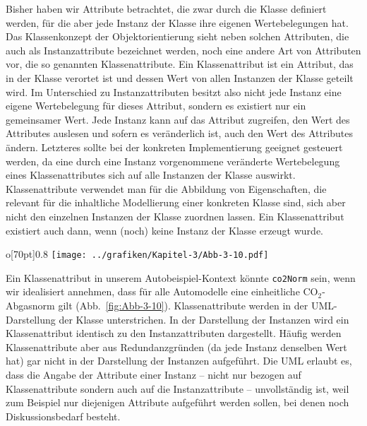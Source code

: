 Bisher haben wir Attribute betrachtet, die zwar durch die Klasse definiert werden, für die aber jede Instanz der Klasse ihre eigenen Wertebelegungen hat. Das Klassenkonzept der Objektorientierung sieht neben solchen Attributen, die auch als Instanzattribute bezeichnet werden, noch eine andere Art von Attributen vor, die so genannten Klassenattribute. 
Ein Klassenattribut ist ein Attribut, das in der Klasse verortet ist und dessen Wert von allen Instanzen der Klasse geteilt wird. Im Unterschied zu Instanzattributen besitzt also nicht jede Instanz eine eigene Wertebelegung für dieses Attribut, sondern es existiert nur ein gemeinsamer Wert. Jede Instanz kann auf das Attribut zugreifen, den Wert des Attributes auslesen und sofern es veränderlich ist, auch den Wert des Attributes ändern. Letzteres sollte bei der konkreten Implementierung geeignet gesteuert werden, da eine durch eine Instanz vorgenommene veränderte Wertebelegung eines Klassenattributes sich auf alle Instanzen der Klasse auswirkt. Klassenattribute verwendet man für die Abbildung von Eigenschaften, die relevant für die inhaltliche Modellierung einer konkreten Klasse sind, sich aber nicht den einzelnen Instanzen der Klasse zuordnen lassen. Ein Klassenattribut existiert auch dann, wenn (noch) keine Instanz der Klasse erzeugt wurde. \begin{wrapfigure}{o}[70pt]{0.8\textwidth}
	\centering
	\texttt{[image: ../grafiken/Kapitel-3/Abb-3-10.pdf]}
	\caption{Eine Klasse \texttt{Auto} mit Instanzattributen \texttt{modell} und \texttt{farbe} und dem Klassenattribut \texttt{co2Norm} (oben) sowie drei anonyme Instanzen der Klasse Auto (unten)}
	\label{fig:Abb-3-10}
	\vspace{-6pt}
\end{wrapfigure}
Ein Klassenattribut in unserem Autobeispiel-Kontext könnte \texttt{co2Norm} sein, wenn wir idealisiert annehmen, dass für alle Automodelle eine einheitliche CO$_2$-Abgasnorm gilt (Abb.~\ref{fig:Abb-3-10}). Klassenattribute werden in der UML-Darstellung der Klasse unterstrichen. In der Darstellung der Instanzen wird ein Klassenattribut identisch zu den Instanzattributen dargestellt. Häufig werden Klassenattribute aber aus Redundanzgründen (da jede Instanz denselben Wert hat) gar nicht in der Darstellung der Instanzen aufgeführt. Die UML erlaubt es, dass die Angabe der Attribute einer Instanz – nicht nur bezogen auf Klassenattribute sondern auch auf die Instanzattribute – unvollständig ist, weil zum Beispiel nur diejenigen Attribute aufgeführt werden sollen, bei denen noch Diskussionsbedarf besteht.